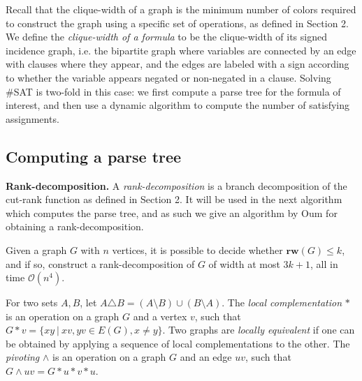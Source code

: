 Recall that the clique-width of a graph is the minimum number of colors required to construct the graph using a specific set of operations, as defined in Section 2.
We define the {\em clique-width of a formula} to be the clique-width of its signed incidence graph, i.e. the bipartite graph where variables are connected by an edge with clauses where they appear, and the edges are labeled with a sign according to whether the variable appears negated or non-negated in a clause.
Solving \#SAT is two-fold in this case: we first compute a parse tree for the formula of interest, and then use a dynamic algorithm to compute the number of satisfying assignments.

\subsection{Computing a parse tree}

\iffalse
\textbf{Rank-decomposition.}
A {\em rank-decomposition} is a branch decomposition of the cut-rank function as defined in Section 2.
It will be used in the next algorithm which computes the parse tree, and as such we give an algorithm by Oum \cite{DBLP:journals/talg/Oum08} for obtaining a rank-decomposition.
\begin{lemma}
	Given a graph $G$ with $n$ vertices, it is possible to decide whether $\mathbf{rw}(G) \leq k$, and if so, construct a rank-decomposition of $G$ of width at most $3k+1$, all in time $\mathcal{O}(n^4)$.
\end{lemma}
For two sets $A,B$, let $A \triangle B = (A \setminus B) \cup (B \setminus A)$.
The {\em local complementation} $*$ is an operation on a graph $G$ and a vertex $v$, such that $G * v = \{ xy \ | \ xv,yv \in E(G), x \neq y \}$.
Two graphs are {\em locally equivalent} if one can be obtained by applying a sequence of local complementations to the other.
The {\em pivoting} $\land$ is an operation on a graph $G$ and an edge $uv$, such that $G \land uv = G * u * v * u$. 

